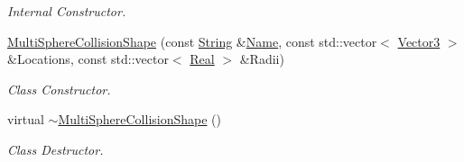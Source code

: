 \begin{DoxyCompactItemize}
\begin{DoxyCompactList}\small\item\em Internal Constructor. \item\end{DoxyCompactList}\item 
\hyperlink{classMezzanine_1_1MultiSphereCollisionShape_a51a5c4e42a736177c111e7ae6b319e39}{MultiSphereCollisionShape} (const \hyperlink{namespaceMezzanine_acf9fcc130e6ebf08e3d8491aebcf1c86}{String} \&\hyperlink{classMezzanine_1_1CollisionShape_aac524c5c56fa4d158bc071f8aecfbe79}{Name}, const std::vector$<$ \hyperlink{classMezzanine_1_1Vector3}{Vector3} $>$ \&Locations, const std::vector$<$ \hyperlink{namespaceMezzanine_a726731b1a7df72bf3583e4a97282c6f6}{Real} $>$ \&Radii)
\begin{DoxyCompactList}\small\item\em Class Constructor. \item\end{DoxyCompactList}\item 
\hypertarget{classMezzanine_1_1MultiSphereCollisionShape_a8a481bacb5aa02bfb21b3c7d9ca885de}{
virtual \hyperlink{classMezzanine_1_1MultiSphereCollisionShape_a8a481bacb5aa02bfb21b3c7d9ca885de}{$\sim$MultiSphereCollisionShape} ()}
\label{classMezzanine_1_1MultiSphereCollisionShape_a8a481bacb5aa02bfb21b3c7d9ca885de}

\begin{DoxyCompactList}\small\item\em Class Destructor. \item\end{DoxyCompactList}\end{DoxyCompactItemize}
